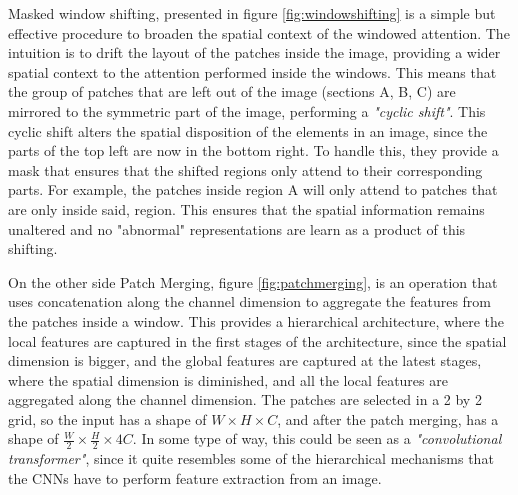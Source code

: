 Masked window shifting, presented in figure \ref{fig:windowshifting} is a simple but effective procedure to broaden the spatial context of the windowed attention. The intuition is to drift the layout of the patches inside the image, providing a wider spatial context to the attention performed inside the windows. This means that the group of patches that are left out of the image (sections A, B, C) are mirrored to the symmetric part of the image, performing a \textit{"cyclic shift"}. This cyclic shift alters the spatial disposition of the elements in an image, since the parts of the top left are now in the bottom right. To handle this, they provide a mask that ensures that the shifted regions only attend to their corresponding parts. For example, the patches inside region A will only attend to patches that are only inside said, region. This ensures that the spatial information remains unaltered and no "abnormal" representations are learn as a product of this shifting. 

On the other side Patch Merging, figure \ref{fig:patchmerging}, is an operation that uses concatenation along the channel dimension to aggregate the features from the patches inside a window. This provides a hierarchical architecture, where the local features are captured in the first stages of the architecture, since the spatial dimension is bigger, and the global features are captured at the latest stages, where the spatial dimension is diminished, and all the local features are aggregated along the channel dimension. The patches are selected in a 2 by 2 grid, so the input has a shape of $W \times H \times C$, and after the patch merging, has a shape of $\frac{W}{2} \times \frac{H}{2} \times 4C$. In some type of way, this could be seen as a \textit{"convolutional transformer"}, since it quite resembles some of the hierarchical mechanisms that the CNNs have to perform feature extraction from an image. 


